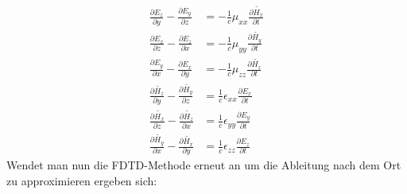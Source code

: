 \documentclass[11pt, ngerman]{article}
\begin{document}
\begin{align}
	\frac{\partial E_z}{\partial y} - \frac{\partial E_y}{\partial z} &= -\frac{1}{c}\mu_{xx}\frac{\partial\widetilde{H_x}}{\partial t}\\
	\frac{\partial E_x}{\partial z} - \frac{\partial E_z}{\partial x} &= -\frac{1}{c}\mu_{yy}\frac{\partial\widetilde{H_y}}{\partial t}\\
	\frac{\partial E_y}{\partial x} - \frac{\partial E_x}{\partial y} &= -\frac{1}{c}\mu_{zz}\frac{\partial\widetilde{H_z}}{\partial t}\\
	\frac{\partial \widetilde{H_z}}{\partial y} - \frac{\partial\widetilde{H_y}}{\partial z} &= \frac{1}{c}\epsilon_{xx}\frac{\partial E_x}{\partial t}\\
	\frac{\partial \widetilde{H_x}}{\partial z} - \frac{\partial \widetilde{H_z}}{\partial x} &= \frac{1}{c}\epsilon_{yy}\frac{\partial E_y}{\partial t}\\
	\frac{\partial \widetilde{H_y}}{\partial x} - \frac{\partial\widetilde{H_x}}{\partial y} &= \frac{1}{c}\epsilon_{zz}\frac{\partial E_z}{\partial t}
\end{align}
Wendet man nun die FDTD-Methode erneut an um die Ableitung nach dem Ort zu approximieren ergeben sich:
\end{document}
